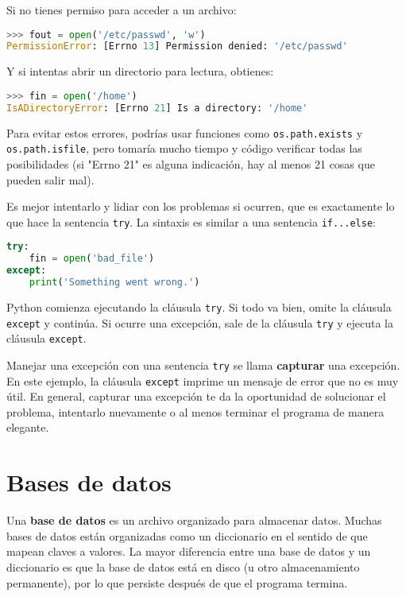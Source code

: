 Si no tienes permiso para acceder a un archivo:

\begin{lstlisting}[language=Python]
>>> fout = open('/etc/passwd', 'w')
PermissionError: [Errno 13] Permission denied: '/etc/passwd'
\end{lstlisting}

Y si intentas abrir un directorio para lectura, obtienes:

\begin{lstlisting}[language=Python]
>>> fin = open('/home')
IsADirectoryError: [Errno 21] Is a directory: '/home'
\end{lstlisting}

Para evitar estos errores, podrías usar funciones como \texttt{os.path.exists} y \texttt{os.path.isfile}, pero tomaría mucho tiempo y código verificar todas las posibilidades (si "Errno 21" es alguna indicación, hay al menos 21 cosas que pueden salir mal).

Es mejor intentarlo y lidiar con los problemas si ocurren, que es exactamente lo que hace la sentencia \texttt{try}. La sintaxis es similar a una sentencia \texttt{if...else}:

\begin{lstlisting}[language=Python]
try:
    fin = open('bad_file')
except:
    print('Something went wrong.')
\end{lstlisting}

Python comienza ejecutando la cláusula \texttt{try}. Si todo va bien, omite la cláusula \texttt{except} y continúa. Si ocurre una excepción, sale de la cláusula \texttt{try} y ejecuta la cláusula \texttt{except}.

Manejar una excepción con una sentencia \texttt{try} se llama \textbf{capturar} una excepción. En este ejemplo, la cláusula \texttt{except} imprime un mensaje de error que no es muy útil. En general, capturar una excepción te da la oportunidad de solucionar el problema, intentarlo nuevamente o al menos terminar el programa de manera elegante.

\section{Bases de datos}

Una \textbf{base de datos} es un archivo organizado para almacenar datos. Muchas bases de datos están organizadas como un diccionario en el sentido de que mapean claves a valores. La mayor diferencia entre una base de datos y un diccionario es que la base de datos está en disco (u otro almacenamiento permanente), por lo que persiste después de que el programa termina.

